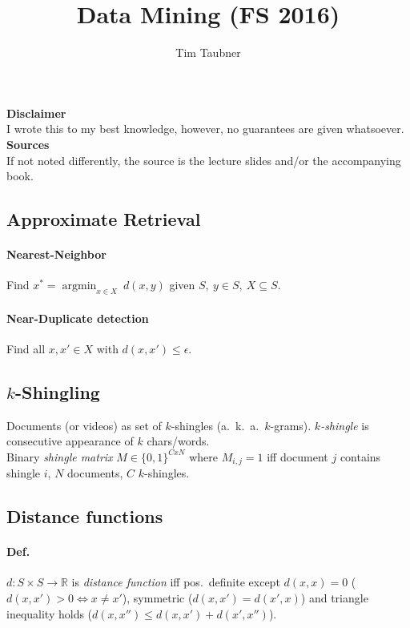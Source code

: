 \documentclass[a4paper, 9pt, DIV=24]{scrartcl}
\title{Data Mining (FS 2016)}
\author{Tim Taubner}
\DeclareMathOperator{\argmin}{argmin}
\newcommand{\eps}{\epsilon}
\newcommand{\R}{\mathbb{R}}
\begin{document}
\pagestyle{fancy}
\fancyhf{}
\fancyhead[L]{\title}

\begin{centering}
\vspace*{1em}
\vfill
\textbf{Disclaimer} \\
I wrote this to my best knowledge, however, no guarantees are given whatsoever.
\vfill
\textbf{Sources} \\
If not noted differently, the source is the lecture slides and/or the accompanying book.
\vfill
\end{centering}

\setcounter{page}{0}

\clearpage

\begin{twocolumn}

\section{Approximate Retrieval}
\paragraph{Nearest-Neighbor} Find $x^* = \argmin_{x \in X} \ d(x,y)$
given $S,\ y \in S,\ X\subseteq S$.
\paragraph{Near-Duplicate detection}
Find all $x, x'\in X$ with $d(x,x') \leq \eps$.
\subsection{$k$-Shingling}
Documents (or videos) as set of $k$-shingles (a.\ k.\ a.\ $k$-grams).
\emph{$k$-shingle} is consecutive appearance of $k$ chars/words. \\
Binary \emph{shingle matrix} $M \in \{0,1\}^{CxN}$ where $M_{i,j} = 1$ iff document $j$ contains shingle $i$, $N$ documents, $C$ $k$-shingles.
\subsection{Distance functions}
\paragraph{Def.}
$d: S \times S \rightarrow \R$ is \emph{distance function} iff pos.\ definite except $d(x,x) = 0$ ($d(x,x') > 0 \iff x \neq x'$), symmetric ($d(x,x') = d(x',x)$) and triangle inequality holds ($d(x,x'') \leq d(x,x') + d(x',x'')$).

\end{twocolumn}
\end{document}
